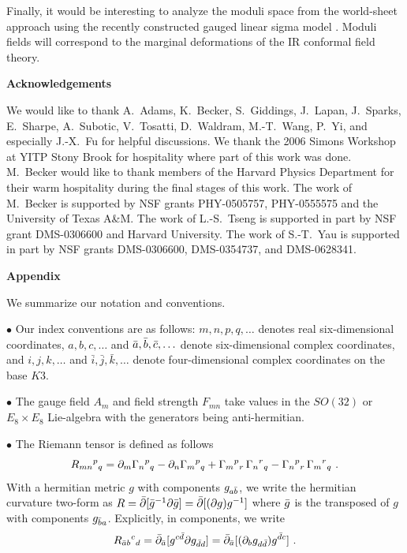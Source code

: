 Finally, it would be interesting to analyze the moduli space from
the world-sheet approach using the recently constructed gauged
linear sigma model . Moduli fields will correspond to
the marginal deformations of the IR conformal field theory.

\bigskip\bigskip\bigskip




\centerline{\bf Acknowledgements}
\medskip
 We would like to thank A.~Adams, K.~Becker, S.~Giddings, J.~Lapan,
 J.~Sparks,
 E.~Sharpe, A.~Subotic, V.~Tosatti, D.~Waldram, M.-T.~Wang, P.~Yi, and especially J.-X.~Fu for helpful discussions.
 We thank the 2006 Simons Workshop at YITP Stony Brook for hospitality where part of this work
 was done.  M.~Becker would like to thank members of the
 Harvard Physics Department for their warm hospitality during the final
 stages of this work.  The work of M.~Becker is supported by NSF grants
 PHY-0505757, PHY-0555575 and the University of Texas A\&M. The work
 of L.-S.~Tseng is supported in part by NSF grant DMS-0306600 and Harvard University.  The work
 of S.-T.~Yau is supported in part by NSF grants DMS-0306600, DMS-0354737, and DMS-0628341.



\bigskip\bigskip\bigskip




\centerline{\bf Appendix}

\medskip


We summarize our notation and conventions.


\item{$\bullet$} Our index conventions are as follows:
$m,n,p,q,\ldots$ denotes real six-dimensional coordinates, $a, b,
c, \ldots$ and ${\bar a}, {\bar b}, {\bar c}, \ldots$ denote six-dimensional
complex coordinates, and $i,j,k,\ldots$ and ${\bar i}, {\bar j},
{\bar k}, \ldots$ denote four-dimensional complex coordinates on
the base $K3$.

\item{$\bullet$} The gauge field $A_m$ and field strength $F_{mn}$
take values in the $SO(32)$ or $E_8\times E_8$ Lie-algebra with
the generators being anti-hermitian.

\item{$\bullet$} The Riemann tensor is defined as follows
$$
R_{mn}{}^p{}_q=\partial_m \Gamma_n{}^p{}_q-\partial_n \Gamma_m{}^p{}_q +
\Gamma_m{}^p{}_r\, \Gamma_n{}^r{}_q-\Gamma_n{}^p{}_r\,\Gamma_m{}^r{}_q~.$$ With a
hermitian metric $g$ with components $g_{a{\bar b}}$, we write the
hermitian curvature two-form as $R={\bar \partial}[{\bar g}^{-1}\partial {\bar g}]={\bar \partial}[(\partial
g) g^{-1}]$ where ${\bar g}$ is the transposed of $g$ with components
$g_{{\bar b} a}$.  Explicitly, in components, we write
$$R_{{\bar a} b}{}^c{}_d = {\bar \partial}_{\bar a}[g^{c{\bar d}}\partial g_{{\bar d} d}]={\bar \partial}_{\bar a}[(\partial_b g_{d{\bar d}})g^{{\bar d} c}]~.$$

